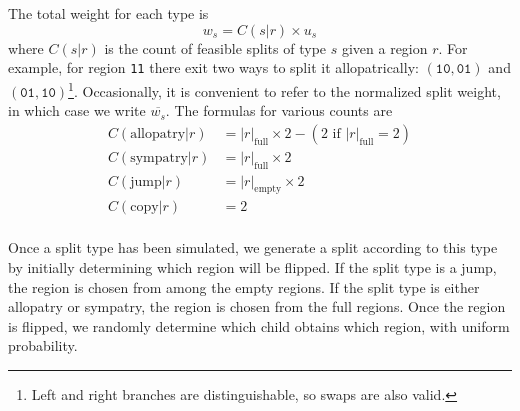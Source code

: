 \documentclass[a4paper]{article}
\newcommand{\CountFull}[1]{|#1|_\text{full}}
\newcommand{\CountEmpty}[1]{|#1|_\text{empty}}
\begin{document}
The total weight for each type is
\begin{equation}
	w_s = C(s|r) \times u_s
\end{equation}
where $C(s|r)$ is the count of feasible splits of type $s$ given a region $r$.
For example, for region \texttt{11} there exit two ways to split it
allopatrically: $(\texttt{10}, \texttt{01})$ and $(\texttt{01},
\texttt{10})$\footnote{Left and right branches are distinguishable, so swaps
	are also valid.}\footnotemark.
Occasionally, it is convenient to refer to the normalized split weight, in
which case we write \( \overline{w_s} \).
The formulas for various counts are
\begin{align*}
  C(\text{allopatry}|r) & =
  \CountFull{r} \times 2 - (2 \text{ if } \CountFull{r} = 2) \\
  C(\text{sympatry}|r)  & = \CountFull{r} \times 2           \\ C(\text{jump}|r) & =
  \CountEmpty{r} \times 2                                    \\ C(\text{copy}|r) & = 2 \\
\end{align*}


Once a split type has been simulated, we generate
a split according to this type by initially determining which region will be
flipped\footnotemark.
If the split type is a jump, the region is chosen from among the empty regions.
If the split type is either allopatry or sympatry, the region is chosen from the
full regions.
Once the region is flipped, we randomly determine which child obtains which region,
with uniform probability.

\end{document}
